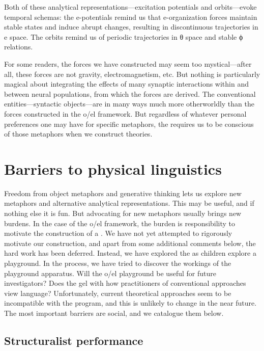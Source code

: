   Both of these analytical representations—excitation potentials and orbits—evoke temporal schemas: the e-potentials remind us that e-organization forces maintain stable states and induce abrupt changes, resulting in discontinuous trajectories in e space. The orbits remind us of periodic trajectories in θ space and stable ϕ relations.

  For some readers, the forces we have constructed may seem too mystical—after all, these forces are not gravity, electromagnetism, etc. But nothing is particularly magical about integrating the effects of many synaptic interactions within and between neural populations, from which the forces are derived. The conventional entities—syntactic objects—are in many ways much more otherworldly than the forces constructed in the o/el framework. But regardless of whatever personal preferences one may have for specific metaphors, the  requires us to be conscious of those metaphors when we construct theories.

\section{Barriers to physical linguistics}

Freedom from object metaphors and generative thinking lets us explore new metaphors and alternative analytical representations. This may be useful, and if nothing else it is fun. But advocating for new metaphors usually brings new burdens. In the case of the o/el framework, the burden is responsibility to motivate the construction of a . We have not yet attempted to rigorously motivate our  construction, and apart from some additional comments below, the hard work has been deferred. Instead, we have explored the  as children explore a playground. In the process, we have tried to discover the workings of the playground apparatus. Will the o/el playground be useful for future investigators? Does the  gel with how practitioners of conventional approaches view language? Unfortunately, current theoretical approaches seem to be incompatible with the  program, and this is unlikely to change in the near future. The most important barriers are social, and we catalogue them below.

\subsection{Structuralist performance}

